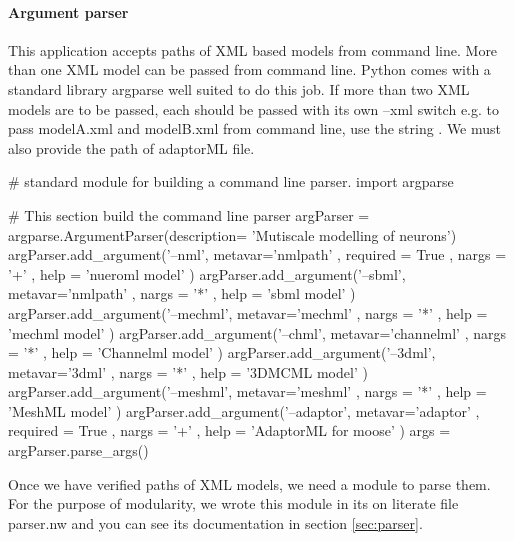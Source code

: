 \documentclass[]{article}%
\begin{document}
\eatline
{}\nwendcode{}\nwdocspar
\paragraph{Argument parser}

  This application accepts paths of XML based models from command line. More
  than one XML model can be passed from command line. Python comes with a
  standard library {\Tt{}argparse\nwendquote} well suited to do this job. If more than two
  XML models are to be passed, each should be passed with its own {\Tt{}--xml\nwendquote}
  switch e.g. to pass {\Tt{}modelA.xml\nwendquote} and {\Tt{}modelB.xml\nwendquote} from command line, use
  the string {}. We must also
  provide the path of {\Tt{}adaptorML\nwendquote} file.

\nwenddocs{}\endmoddef\nwstartdeflinemarkup{}\nwenddeflinemarkup
# standard module for building a command line parser.
import argparse

# This section build the command line parser
argParser = argparse.ArgumentParser(description= 'Mutiscale modelling of neurons')
argParser.add_argument('--nml', metavar='nmlpath'
    , required = True
    , nargs = '+'
    , help = 'nueroml model'
    )
argParser.add_argument('--sbml', metavar='nmlpath'
    , nargs = '*'
    , help = 'sbml model'
    )
argParser.add_argument('--mechml', metavar='mechml'
    , nargs = '*'
    , help = 'mechml model'
    )
argParser.add_argument('--chml', metavar='channelml'
    , nargs = '*'
    , help = 'Channelml model'
    )
argParser.add_argument('--3dml', metavar='3dml'
    , nargs = '*'
    , help = '3DMCML model'
    )
argParser.add_argument('--meshml', metavar='meshml'
    , nargs = '*'
    , help = 'MeshML model'
    )
argParser.add_argument('--adaptor', metavar='adaptor'
    , required = True
    , nargs = '+'
    , help = 'AdaptorML for moose'
    )
args = argParser.parse_args()

\eatline
{}\nwendcode{}\nwdocspar
  Once we have verified paths of XML models, we need a module to parse them. For
  the purpose of modularity, we wrote this module in its on literate file
  {\Tt{}parser.nw\nwendquote} and you can see its documentation in section \ref{sec:parser}.
\end{document}
